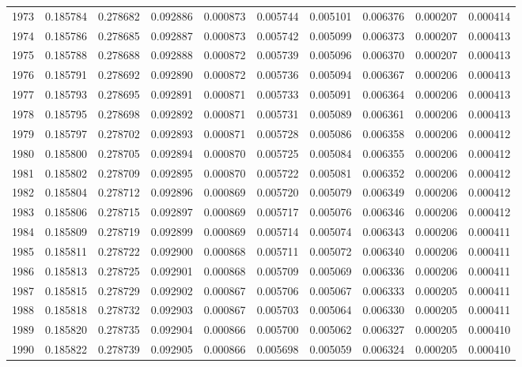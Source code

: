 \begin{tabular}{lrrrrrrrrr}
1973 & 0.185784 & 0.278682 & 0.092886 & 0.000873 & 0.005744 & 0.005101 & 0.006376 & 0.000207 & 0.000414 \\
1974 & 0.185786 & 0.278685 & 0.092887 & 0.000873 & 0.005742 & 0.005099 & 0.006373 & 0.000207 & 0.000413 \\
1975 & 0.185788 & 0.278688 & 0.092888 & 0.000872 & 0.005739 & 0.005096 & 0.006370 & 0.000207 & 0.000413 \\
1976 & 0.185791 & 0.278692 & 0.092890 & 0.000872 & 0.005736 & 0.005094 & 0.006367 & 0.000206 & 0.000413 \\
1977 & 0.185793 & 0.278695 & 0.092891 & 0.000871 & 0.005733 & 0.005091 & 0.006364 & 0.000206 & 0.000413 \\
1978 & 0.185795 & 0.278698 & 0.092892 & 0.000871 & 0.005731 & 0.005089 & 0.006361 & 0.000206 & 0.000413 \\
1979 & 0.185797 & 0.278702 & 0.092893 & 0.000871 & 0.005728 & 0.005086 & 0.006358 & 0.000206 & 0.000412 \\
1980 & 0.185800 & 0.278705 & 0.092894 & 0.000870 & 0.005725 & 0.005084 & 0.006355 & 0.000206 & 0.000412 \\
1981 & 0.185802 & 0.278709 & 0.092895 & 0.000870 & 0.005722 & 0.005081 & 0.006352 & 0.000206 & 0.000412 \\
1982 & 0.185804 & 0.278712 & 0.092896 & 0.000869 & 0.005720 & 0.005079 & 0.006349 & 0.000206 & 0.000412 \\
1983 & 0.185806 & 0.278715 & 0.092897 & 0.000869 & 0.005717 & 0.005076 & 0.006346 & 0.000206 & 0.000412 \\
1984 & 0.185809 & 0.278719 & 0.092899 & 0.000869 & 0.005714 & 0.005074 & 0.006343 & 0.000206 & 0.000411 \\
1985 & 0.185811 & 0.278722 & 0.092900 & 0.000868 & 0.005711 & 0.005072 & 0.006340 & 0.000206 & 0.000411 \\
1986 & 0.185813 & 0.278725 & 0.092901 & 0.000868 & 0.005709 & 0.005069 & 0.006336 & 0.000206 & 0.000411 \\
1987 & 0.185815 & 0.278729 & 0.092902 & 0.000867 & 0.005706 & 0.005067 & 0.006333 & 0.000205 & 0.000411 \\
1988 & 0.185818 & 0.278732 & 0.092903 & 0.000867 & 0.005703 & 0.005064 & 0.006330 & 0.000205 & 0.000411 \\
1989 & 0.185820 & 0.278735 & 0.092904 & 0.000866 & 0.005700 & 0.005062 & 0.006327 & 0.000205 & 0.000410 \\
1990 & 0.185822 & 0.278739 & 0.092905 & 0.000866 & 0.005698 & 0.005059 & 0.006324 & 0.000205 & 0.000410 \\

\end{tabular}
